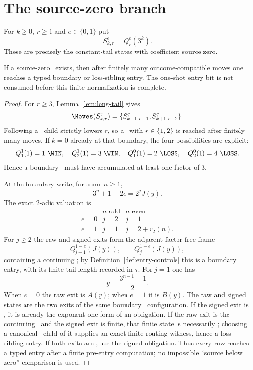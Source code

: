 \section{The source-zero branch}

For $k\ge0$, $r\ge1$ and $e\in\{0,1\}$ put
\[
  S_{k,r}^e=Q_r^e(3^k).
\]
These are precisely the constant-tail states with coefficient source zero.

\begin{lemma}\label{lem:zero-source}
If a source-zero \DRAW\ exists, then after finitely many outcome-compatible
moves one reaches a typed boundary or loss-sibling entry. The one-shot entry
bit is not consumed before this finite normalization is complete.
\end{lemma}

\begin{proof}
For $r\ge3$, Lemma~\ref{lem:long-tail} gives
\[
  \Moves(S_{k,r}^e)=\{S_{k+1,r-1}^e,S_{k+1,r-2}^e\}.
\]
Following a \DRAW\ child strictly lowers $r$, so a \DRAW\ with $r\in\{1,2\}$
is reached after finitely many moves. If $k=0$ already at that boundary, the
four possibilities are explicit:
\[
 Q_1^1(1)=1\ \WIN,\quad Q_2^1(1)=3\ \WIN,\quad
 Q_1^0(1)=2\ \LOSS,\quad Q_2^0(1)=4\ \LOSS.
\]
Hence a boundary \DRAW\ must have accumulated at least one factor of $3$.

At the boundary write, for some $n\ge1$,
\[
  3^n+1-2e=2^jJ(y).
\]
The exact $2$-adic valuation is
\[
\begin{array}{c|cc}
 &n\text{ odd}&n\text{ even}\\ \hline
 e=0&j=2&j=1\\
 e=1&j=1&j=2+v_2(n).
\end{array}
\]
For $j\ge2$ the raw and signed exits form the adjacent factor-free frame
\[
  Q_{j-1}^{1-e}(J(y)),\qquad Q_j^{1-e}(J(y)),
\]
containing a continuing \DRAW; by Definition~\ref{def:entry-controls} this is a boundary entry, with its finite tail length recorded in $\tau$. For $j=1$ one has
\[
  y=\frac{3^{n-1}-1}{2}.
\]
When $e=0$ the raw exit is $A(y)$; when $e=1$ it is $B(y)$. The raw and
signed states are the two exits of the same boundary \DRAW\ configuration.
If the signed exit is \DRAW, it is already the exponent-one form of an
obligation. If the raw exit is the continuing \DRAW\ and the signed exit is
finite, that finite state is necessarily \WIN; choosing a canonical \LOSS\
child of it supplies an exact finite routing witness, hence a loss-sibling
entry. If both exits are \DRAW, use the signed obligation. Thus every row
reaches a typed entry after a finite pre-entry computation; no impossible
``source below zero'' comparison is used.
\end{proof}

